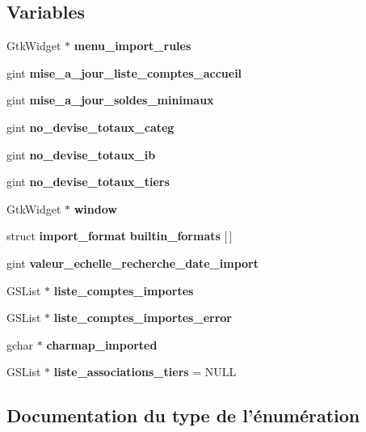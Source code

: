 \subsection*{Variables}
\begin{DoxyCompactItemize}
\item 
GtkWidget $\ast$ {\bf menu\_\-import\_\-rules}
\item 
gint {\bf mise\_\-a\_\-jour\_\-liste\_\-comptes\_\-accueil}
\item 
gint {\bf mise\_\-a\_\-jour\_\-soldes\_\-minimaux}
\item 
gint {\bf no\_\-devise\_\-totaux\_\-categ}
\item 
gint {\bf no\_\-devise\_\-totaux\_\-ib}
\item 
gint {\bf no\_\-devise\_\-totaux\_\-tiers}
\item 
GtkWidget $\ast$ {\bf window}
\item 
struct {\bf import\_\-format} {\bf builtin\_\-formats} [$\,$]
\item 
gint {\bf valeur\_\-echelle\_\-recherche\_\-date\_\-import}
\item 
GSList $\ast$ {\bf liste\_\-comptes\_\-importes}
\item 
GSList $\ast$ {\bf liste\_\-comptes\_\-importes\_\-error}
\item 
gchar $\ast$ {\bf charmap\_\-imported}
\item 
GSList $\ast$ {\bf liste\_\-associations\_\-tiers} = NULL
\end{DoxyCompactItemize}


\subsection{Documentation du type de l'énumération}
